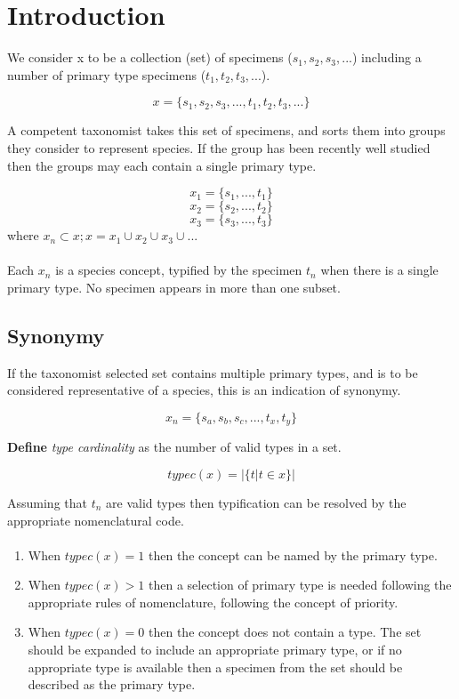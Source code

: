 \documentclass{article}
\begin{document}
   \section{Introduction}
   We consider x to be a collection (set) of specimens ($s_1, s_2, s_3, ...$) including a number of primary type specimens ($t_1, t_2, t_3, ...$).
   
   \[x = \{s_1, s_2, s_3, ..., t_1, t_2, t_3, ...\}\]
   
   A competent taxonomist takes this set of specimens, and sorts them into groups they consider to represent species. If the group has been recently well studied then the groups may each contain a single primary type.

   \[x_1 = \{s_1, ..., t_1\}\]
   \[x_2 = \{s_2, ..., t_2\}\]
   \[x_3 = \{s_3, ..., t_3\}\]
   where $x_n \subset x; x= x_1 \cup x_2 \cup x_3 \cup ...$
   
   \paragraph{}
   Each $x_n$ is a species concept, typified by the specimen $t_n$ when there is a single primary type. No specimen appears in more than one subset.
   
   \subsection{Synonymy}
   If the taxonomist selected set contains multiple primary types, and is to be considered representative of a species, this is an indication of synonymy.
   
   \[x_n = \{s_a, s_b, s_c, ..., t_x, t_y\}\]
   
   \textbf{Define} \textit{type cardinality} as the number of valid types in a set.
   
   \[typec(x) = \left|\{t|t \in x\}\right| \]
   
   Assuming that $t_n$ are valid types then typification can be resolved by the appropriate nomenclatural code.
   \paragraph{}
   \begin{enumerate}
   \item When $typec(x) = 1$ then the concept can be named by the primary type.
   \item When $typec(x) > 1$ then a selection of primary type is needed following the appropriate rules of nomenclature, following the concept of priority.
   \item When $typec(x) = 0$ then the concept does not contain a type. The set should be expanded to include an appropriate primary type, or if no appropriate type is available then a specimen from the set should be described as the primary type.
   \end{enumerate}
   
\end{document}
